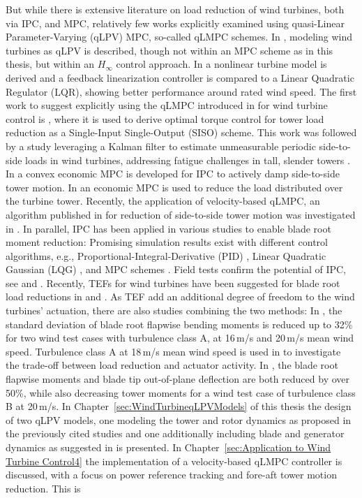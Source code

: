 But while there is extensive literature on load reduction of wind turbines, both via IPC, and MPC, relatively few works explicitly examined using quasi-Linear Parameter-Varying (qLPV) MPC, so-called qLMPC schemes. In \cite{Bianchi2007}, modeling wind turbines as qLPV is described, though not within an MPC scheme as in this thesis, but within an $H_{\infty}$ control approach. In \cite{kumar2010FeedbackLinLQR} a nonlinear turbine model is derived and a feedback linearization controller is compared to a Linear Quadratic Regulator (LQR), showing better performance around rated wind speed. The first work to suggest explicitly using the qLMPC introduced in \cite{cisneros2016efficient} for wind turbine control is \cite{mulders2020preventing}, where it is used to derive optimal torque control for tower load reduction as a Single-Input Single-Output (SISO) scheme. This work was followed by a study leveraging a Kalman filter to estimate unmeasurable periodic side-to-side loads in wind turbines, addressing fatigue challenges in tall, slender towers \cite{pamososuryo2022loadestimation}. In \cite{pamososuryo2022individual,pamososuryo2023convex} a convex economic MPC is developed for IPC to actively damp side-to-side tower motion. In \cite{feng2022economic} an economic MPC is used to reduce the load distributed over the turbine tower. Recently, the application of velocity-based qLMPC, an algorithm published in \cite{cisneros2020velocity} for reduction of side-to-side tower motion was investigated in \cite{fonseca2024windTurbineSideSide}. In parallel, IPC has been applied in various studies to enable blade root moment reduction: Promising simulation results exist with different control algorithms, e.g., Proportional-Integral-Derivative (PID) \cite{hoffmann2018load}, Linear Quadratic Gaussian (LQG) \cite{selvam2009feedback}, and MPC schemes \cite{petrovic2021mpc}. Field tests confirm the potential of IPC, see \cite{ossmann2021field} and \cite{bossanyi2012advanced}. Recently, TEFs for wind turbines have been suggested for blade root load reductions in \cite{zhang2015parameter} and \cite{bergami2017highfidelity}. As TEF add an additional degree of freedom to the wind turbines' actuation, there are also studies combining the two methods: In \cite{wilson2009combined}, the standard deviation of blade root flapwise bending moments is reduced up to 32\% for two wind test cases with turbulence class A, at 16\,m/s and 20\,m/s mean wind speed. Turbulence class A at 18\,m/s mean wind speed is used in \cite{henriksen2013model} to investigate the trade-off between load reduction and actuator activity. In \cite{he2018combined}, the blade root flapwise moments and blade tip out-of-plane deflection are both reduced by over 50\%, while also decreasing tower moments for a wind test case of turbulence class B at 20\,m/s. In Chapter~\ref{sec:WindTurbineqLPVModels} of this thesis the design of two qLPV models, one modeling the tower and rotor dynamics as proposed in the previously cited studies and one additionally including blade and generator dynamics as suggested in \cite{Bianchi2007} is presented. In Chapter~\ref{sec:Application to Wind Turbine Control4} the implementation of a velocity-based qLMPC controller is discussed, with a focus on power reference tracking and fore-aft tower motion reduction. This is 